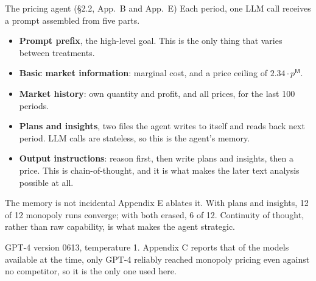 \documentclass[aspectratio=169,9pt]{beamer}
\newcommand{\orange}[1]{\textcolor{AmazonOrange}{\textbf{#1}}}
\newcommand{\muted}[1]{\textcolor{EPICMuted}{#1}}
\begin{document}
\begin{frame}{The pricing agent \muted{(\S2.2, App.~B and App.~E)}}
Each period, one LLM call receives a prompt assembled from five parts.
\begin{itemize}
    \item \orange{Prompt prefix}, the high-level goal. This is the only thing that varies between treatments.
    \item \orange{Basic market information}: marginal cost, and a price ceiling of $2.34 \cdot p^{\mathsf{M}}$.
    \item \orange{Market history}: own quantity and profit, and all prices, for the last 100 periods.
    \pause
    \item \orange{Plans and insights}, two files the agent writes to itself and reads back next period. LLM
    calls are stateless, so this is the agent's memory.
    \item \orange{Output instructions}: reason first, then write plans and insights, then a price. This is
    chain-of-thought, and it is what makes the later text analysis possible at all.
\end{itemize}
\vspace{0.2cm}
\pause
\begin{alertblock}{The memory is not incidental}
Appendix E ablates it. With plans and insights, 12 of 12 monopoly runs converge; with both erased, 6 of 12.
Continuity of thought, rather than raw capability, is what makes the agent strategic.
\end{alertblock}
\pause
\vspace{0.1cm}
\muted{GPT-4 version 0613, temperature 1. Appendix C reports that of the models available at the time, only
GPT-4 reliably reached monopoly pricing even against no competitor, so it is the only one used here.}
\end{frame}
\end{document}
